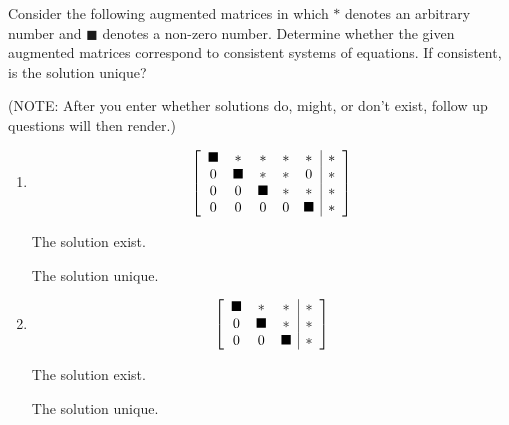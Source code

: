 \documentclass{ximera}
\author{Zack Reed}
\begin{document}
\begin{exercise}

Consider the following augmented matrices in which $\ast$ denotes an
arbitrary number and $\blacksquare$ denotes a non-zero number. Determine
whether the given augmented matrices correspond to consistent systems of equations. If consistent, is the
solution unique?

(NOTE: After you enter whether solutions do, might, or don't exist, follow up questions will then render.)

\begin{enumerate}
    \item \begin{equation*}
    \startmat{ccccc|c}
      \blacksquare & \ast & \ast & \ast & \ast & \ast \\
      0 & \blacksquare & \ast & \ast & 0 & \ast \\
      0 & 0 & \blacksquare & \ast & \ast & \ast \\
      0 & 0 & 0 & 0 & \blacksquare & \ast
    \stopmat
\end{equation*}

The solution  exist.

    \begin{problem}
    
        The solution  unique.

    \end{problem}

\item \begin{equation*}
    \startmat{ccc|c}
      \blacksquare & \ast & \ast & \ast \\
      0 & \blacksquare & \ast & \ast \\
      0 & 0 & \blacksquare & \ast
    \stopmat
\end{equation*}

The solution  exist.

    \begin{problem}
    
        The solution  unique.

    \end{problem}


\end{enumerate}
\end{exercise}
\end{document}
